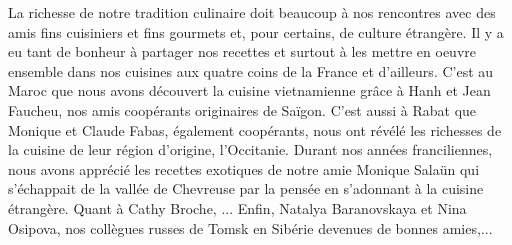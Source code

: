 La richesse de notre tradition culinaire doit beaucoup à nos rencontres avec des amis fins cuisiniers et fins gourmets et, pour certains, de culture étrangère. Il y a eu tant de bonheur à partager nos recettes et surtout à les mettre en oeuvre ensemble dans nos cuisines aux quatre coins de la France et d'ailleurs. C'est au Maroc que nous avons découvert la cuisine vietnamienne grâce à Hanh et Jean Faucheu, nos amis coopérants originaires de Saïgon. C'est aussi à Rabat que Monique et Claude Fabas, également coopérants, nous ont révélé les richesses de la cuisine de leur région d'origine, l'Occitanie. Durant nos années franciliennes, nous avons apprécié les recettes exotiques de notre amie Monique Salaün qui s'échappait de la vallée de Chevreuse par la pensée en s'adonnant à la cuisine étrangère. Quant à Cathy Broche, ... Enfin, Natalya Baranovskaya et Nina Osipova, nos collègues russes de Tomsk en Sibérie devenues de bonnes amies,...   